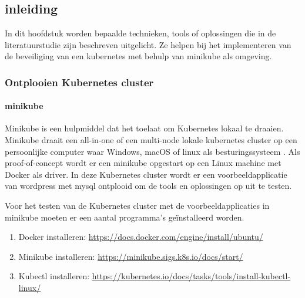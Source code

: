 
\chapter{}%
\label{ch:Proof-of-concept}

\section{inleiding}

In dit hoofdstuk  worden bepaalde technieken, tools of oplossingen die in de literatuurstudie zijn beschreven uitgelicht. Ze helpen bij het implementeren van de beveiliging van een kubernetes met behulp van minikube als omgeving.

\subsection{Ontplooien Kubernetes cluster}
\subsubsection{minikube}
Minikube is een hulpmiddel dat het toelaat om Kubernetes lokaal te draaien. Minikube draait een all-in-one of een multi-node lokale kubernetes cluster op een persoonlijke computer waar Windows, macOS of linux als besturingssysteem \autocite{KubernetesDocs-2023}. Als proof-of-concept wordt er een minikube opgestart op een Linux machine met Docker als driver. In deze Kubernetes cluster wordt er een voorbeeldapplicatie van wordpress met mysql ontplooid om de tools en oplossingen op uit te testen. \newline

Voor het testen van de Kubernetes cluster met de voorbeeldapplicaties in minikube moeten er een aantal programma's geïnstalleerd worden.

\begin{enumerate}
    \item Docker installeren: \url{https://docs.docker.com/engine/install/ubuntu/}
    \item Minikube installeren: \url{https://minikube.sigs.k8s.io/docs/start/}
    \item Kubectl installeren: \url{https://kubernetes.io/docs/tasks/tools/install-kubectl-linux/}
\end{enumerate}

